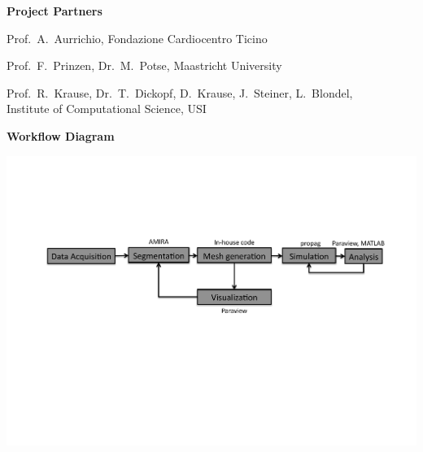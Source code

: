 \documentclass[20pt]{ICSPoster}
\begin{document}
  \begin{posterbox}[2]
    \begin{headerbox}[
        title=End-to-End Workflow,
        height=0.28\textheight,
        width=0.47\textwidth]
      \begin{minipage}{\textwidth}\sf
        \textbf{Project Partners}
        \begin{compactitem}
          \item Prof.~A.~Aurrichio, Fondazione Cardiocentro Ticino
          \item Prof.~F.~Prinzen, Dr.~M.~Potse, Maastricht University
          \item Prof.~R.~Krause, Dr.~T.~Dickopf, D.~Krause, J.~Steiner, L.~Blondel,\\ Institute of Computational Science, USI
        \end{compactitem}
        \vspace{0.5cm}

        \textbf{Workflow Diagram}

        \includegraphics[width=\textwidth]{Workflow}
      \end{minipage}


\end{headerbox}
\end{posterbox}
\end{document}
